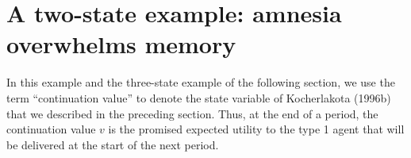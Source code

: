 



\section{A two-state example: amnesia overwhelms
memory}\label{sec:thekink}%
In this example and the three-state example of the following
section, we use the term ``continuation value'' to denote the
state variable of Kocherlakota (1996b) that we  described in the
preceding section. Thus, at the end of a
period, the continuation value $v$ is the promised expected
utility to the type 1 agent that will be delivered at the start of the next
period.
%

